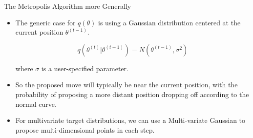 \documentclass[handout]{beamer}
\begin{document}
\begin{frame}{The Metropolis Algorithm more Generally}
\scriptsize{

\begin{itemize}





\item The generic case for $q(\theta)$ is using a Gaussian distribution centered at the current position $\theta^{(t-1)}$.

\begin{displaymath}
 q(\theta^{(t)}|\theta^{(t-1)})=N(\theta^{(t-1)},\sigma^2)
\end{displaymath}

where $\sigma$ is a user-specified parameter.

\item So the proposed move will typically be near the current position, with the probability of proposing a more distant position dropping off according to the normal curve.

\item For multivariate target distributions, we can use a Multi-variate Gaussian to propose multi-dimensional points in each step.


\end{itemize}



}
\end{frame}
\end{document}

